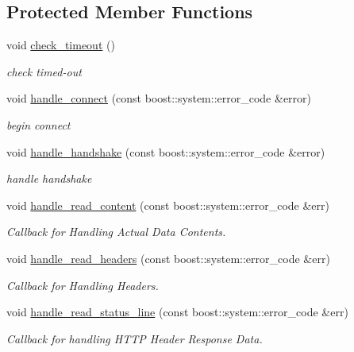 \subsection*{Protected Member Functions}
\begin{DoxyCompactItemize}
\item 
void \hyperlink{classrapp_1_1cloud_1_1asio__socket__https_a52d496ec2e1ef18a9afb8d2a5a7c7c08}{check\-\_\-timeout} ()
\begin{DoxyCompactList}\small\item\em check timed-\/out \end{DoxyCompactList}\item 
void \hyperlink{classrapp_1_1cloud_1_1asio__socket__https_a55aa424cbfca4e0a962de349fbf234d5}{handle\-\_\-connect} (const boost\-::system\-::error\-\_\-code \&error)
\begin{DoxyCompactList}\small\item\em begin connect \end{DoxyCompactList}\item 
void \hyperlink{classrapp_1_1cloud_1_1asio__socket__https_a358db85df829ef70c156fdbf96d6ef15}{handle\-\_\-handshake} (const boost\-::system\-::error\-\_\-code \&error)
\begin{DoxyCompactList}\small\item\em handle handshake \end{DoxyCompactList}\item 
void \hyperlink{classrapp_1_1cloud_1_1asio__socket__https_a9a00d1f13e8a6b1bc894f616ee2fa1d5}{handle\-\_\-read\-\_\-content} (const boost\-::system\-::error\-\_\-code \&err)
\begin{DoxyCompactList}\small\item\em Callback for Handling Actual Data Contents. \end{DoxyCompactList}\item 
void \hyperlink{classrapp_1_1cloud_1_1asio__socket__https_a5e444d75f4d477a3939ca07e490870b5}{handle\-\_\-read\-\_\-headers} (const boost\-::system\-::error\-\_\-code \&err)
\begin{DoxyCompactList}\small\item\em Callback for Handling Headers. \end{DoxyCompactList}\item 
void \hyperlink{classrapp_1_1cloud_1_1asio__socket__https_a7b36215578c9cb74e822c8aac109f7b9}{handle\-\_\-read\-\_\-status\-\_\-line} (const boost\-::system\-::error\-\_\-code \&err)
\begin{DoxyCompactList}\small\item\em Callback for handling H\-T\-T\-P Header Response Data. \end{DoxyCompactList}\item 

\end{DoxyCompactItemize}
